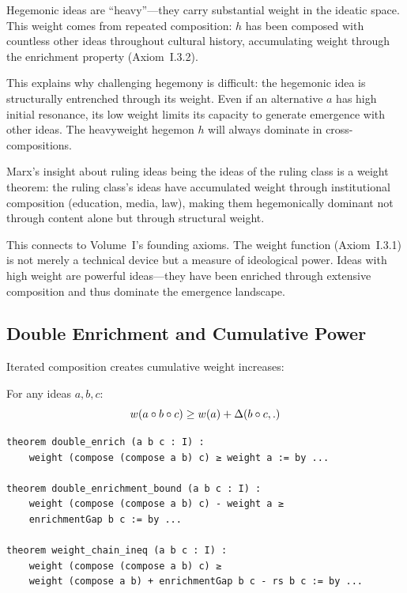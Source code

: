 \begin{interpretation}
Hegemonic ideas are ``heavy''---they carry substantial weight in the ideatic
space. This weight comes from repeated composition: $h$ has been composed with
countless other ideas throughout cultural history, accumulating weight through
the enrichment property (Axiom~I.3.2).

This explains why challenging hegemony is difficult: the hegemonic idea is
structurally entrenched through its weight. Even if an alternative $a$ has
high initial resonance, its low weight limits its capacity to generate emergence
with other ideas. The heavyweight hegemon $h$ will always dominate in cross-compositions.

Marx's insight about ruling ideas being the ideas of the ruling class is a
weight theorem: the ruling class's ideas have accumulated weight through
institutional composition (education, media, law), making them hegemonically
dominant not through content alone but through structural weight.

This connects to Volume~I's founding axioms. The weight function (Axiom~I.3.1)
is not merely a technical device but a measure of ideological power. Ideas with
high weight are powerful ideas---they have been enriched through extensive
composition and thus dominate the emergence landscape.
\end{interpretation}

\subsection{Double Enrichment and Cumulative Power}

Iterated composition creates cumulative weight increases:

\begin{theorem}
\label{thm:double-enrichment}
For any ideas $a, b, c$:
\[
  w(a \circ b \circ c) \geq w(a) + \Delta(b \circ c,.)
\]
\end{theorem}

\begin{lstlisting}[caption={Double enrichment (IDT\_v3\_Emergence.lean)}]
theorem double_enrich (a b c : I) :
    weight (compose (compose a b) c) ≥ weight a := by ...
    
theorem double_enrichment_bound (a b c : I) :
    weight (compose (compose a b) c) - weight a ≥
    enrichmentGap b c := by ...
    
theorem weight_chain_ineq (a b c : I) :
    weight (compose (compose a b) c) ≥
    weight (compose a b) + enrichmentGap b c - rs b c := by ...
\end{lstlisting}

